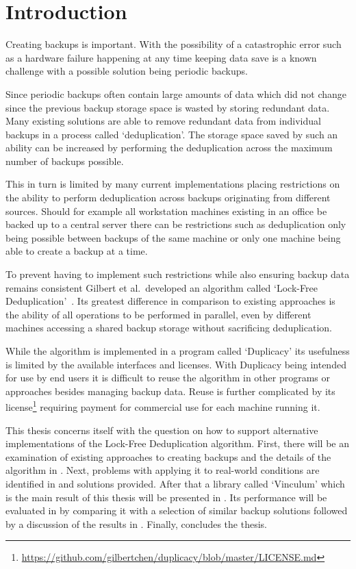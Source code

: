 \chapter{Introduction}\label{ch:introduction}

Creating backups is important.
With the possibility of a catastrophic error such as a hardware failure happening
at any time keeping data save is a known challenge with a possible solution
being periodic backups.

Since periodic backups often contain large amounts of data which did not change
since the previous backup storage space is wasted by storing redundant data.
Many existing solutions are able to remove redundant data from individual backups
in a process called `deduplication'.
The storage space saved by such an ability can be increased by performing
the deduplication across the maximum number of backups possible.

This in turn is limited by many current implementations placing restrictions on
the ability to perform deduplication across backups originating from different
sources.
Should for example all workstation machines existing in an office be backed up
to a central server there can be restrictions such as deduplication only being
possible between backups of the same machine or only one machine being able to
create a backup at a time.

To prevent having to implement such restrictions while also ensuring backup
data remains consistent Gilbert et al.\ developed an algorithm called
`Lock-Free Deduplication'~\cite{Duplicacy}.
Its greatest difference in comparison to existing approaches is the ability of
all operations to be performed in parallel, even by different machines accessing
a shared backup storage without sacrificing deduplication.

While the algorithm is implemented in a program called `Duplicacy' its usefulness
is limited by the available interfaces and licenses.
With Duplicacy being intended for use by end users it is difficult to reuse the
algorithm in other programs or approaches besides managing backup data.
Reuse is further complicated by its license\footnote{\url{https://github.com/gilbertchen/duplicacy/blob/master/LICENSE.md}}
requiring payment for commercial use for each machine running it.

This thesis concerns itself with the question on how to support alternative
implementations of the Lock-Free Deduplication algorithm.
First, there will be an examination of existing approaches to creating backups
and the details of the algorithm in .
Next, problems with applying it to real-world conditions are identified in
 and solutions provided.
After that a library called `Vinculum' which is the main result of this thesis
will be presented in .
Its performance will be evaluated in  by comparing it with
a selection of similar backup solutions followed by a discussion of the results
in .
Finally,  concludes the thesis.
